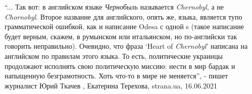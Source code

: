 \enquote{... Так вот: в английском языке \emph{Чернобыль} называется \emph{Chernobyl}, а не \emph{Chornobyl}.
Второе название для английского, опять же, языка, является тупо грамматической
ошибкой, как и написание Odesa с одной s (такое написание будет верным, скажем,
в румынском или итальянском, но по-английски так говорить неправильно).
Очевидно, что фраза \enquote{Heart of \emph{Chernobyl}} написана на английском по правилам
этого языка.  То есть, политические украинцы продолжают исполнять свою
политическую миссию: нести в мир бардак и напыщенную безграмотность.  Хоть
что-то в мире не меняется}, - пишет журналист Юрий Ткачев
, 
Екатерина Терехова, strana.ua, 16.06.2021

